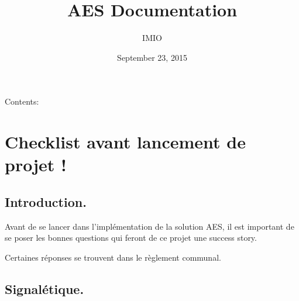 \documentclass[letterpaper,10pt,english]{sphinxmanual}
\title{AES Documentation}
\date{September 23, 2015}
\author{IMIO}
\begin{document}
\maketitle
\tableofcontents
{}\label{index::doc}


Contents:


\chapter{Checklist avant lancement de projet !}
\label{checklist:checklist-avant-lancement-de-projet}\label{checklist::doc}\label{checklist:welcome-to-aes-s-documentation}

\section{Introduction.}
\label{checklist:introduction}
Avant de se lancer dans l'implémentation de la solution AES, il est important de se poser les bonnes questions qui feront de ce projet une success story.

Certaines réponses se trouvent dans le règlement communal.


\section{Signalétique.}
\label{checklist:signaletique}
\end{document}

